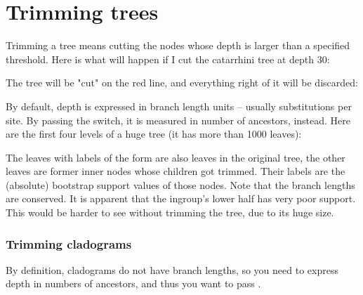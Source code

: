 
\section[sct_trim]{Trimming trees}


Trimming a tree means cutting the nodes whose depth is larger than a specified threshold. Here is what will happen if I cut the catarrhini tree at depth 30:

\midaligned{\externalfigure[trim_1]}

The tree will be "cut" on the red line, and everything right of it will be discarded:


By default, depth is expressed in branch length units -- usually substitutions
per site. By passing the  switch, it is measured in number of
ancestors, instead. Here are the first four levels of a huge tree (it has more than 1000 leaves):


The leaves with labels of the form  are also leaves in
the original tree, the other leaves are former inner nodes whose children got
trimmed.  Their labels are the (absolute) bootstrap support values of those
nodes. Note that the branch lengths are conserved. It is apparent that the
ingroup's lower half has very poor support. This would be harder to see without
trimming the tree, due to its huge size.

\subsubsection{Trimming cladograms}

By definition, cladograms do not have branch lengths, so you need to express depth in numbers of ancestors, and thus you want to pass .
